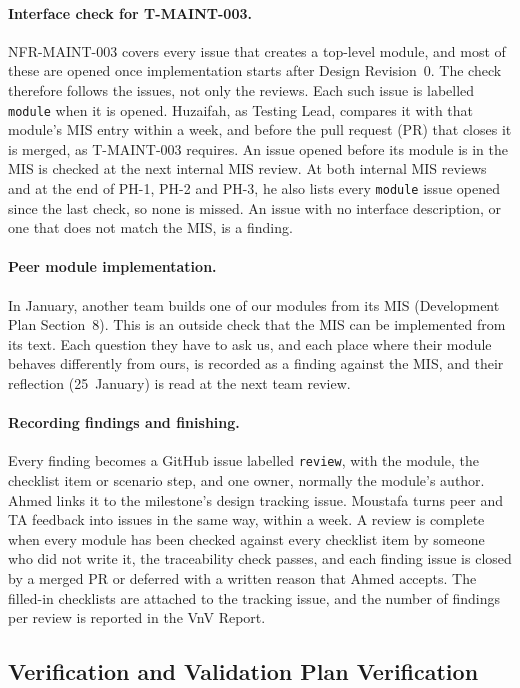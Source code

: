 \documentclass[12pt, titlepage]{article}
\begin{document}
\paragraph{Interface check for T-MAINT-003.} NFR-MAINT-003 covers every
issue that creates a top-level module, and most of these are opened once
implementation starts after Design Revision~0. The check therefore follows
the issues, not only the reviews. Each such issue is labelled
\texttt{module} when it is opened. Huzaifah, as Testing Lead, compares it
with that module's MIS entry within a week, and before the pull request (PR) that closes it is merged, as T-MAINT-003 requires. An issue opened before its module is
in the MIS is checked at the next internal MIS review. At both internal MIS
reviews and at the end of PH-1, PH-2 and PH-3, he also lists every
\texttt{module} issue opened since the last check, so none is missed. An
issue with no interface description, or one that does not match the MIS, is
a finding.

\paragraph{Peer module implementation.} In January, another team builds one
of our modules from its MIS (Development Plan Section~8). This is an outside
check that the MIS can be implemented from its text. Each question they have
to ask us, and each place where their module behaves differently from ours,
is recorded as a finding against the MIS, and their reflection
(25~January) is read at the next team review.

\paragraph{Recording findings and finishing.} Every finding becomes a GitHub
issue labelled \texttt{review}, with the module, the checklist item or
scenario step, and one owner, normally the module's author. Ahmed links it to
the milestone's design tracking issue. Moustafa turns peer and TA feedback
into issues in the same way, within a week. A review is complete when every
module has been checked against every checklist item by someone who did not
write it, the traceability check passes, and each finding issue is closed by
a merged PR or deferred with a written reason that Ahmed accepts. The
filled-in checklists are attached to the tracking issue, and the number of
findings per review is reported in the VnV Report.

\subsection{Verification and Validation Plan Verification}
\label{sec:plan-verification}
\end{document}
